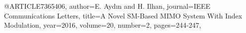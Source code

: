 @ARTICLE{7365406,
  author={E. {Aydın} and H. {Ilhan}},
  journal={IEEE Communications Letters}, 
  title={A Novel SM-Based MIMO System With Index Modulation}, 
  year={2016},
  volume={20},
  number={2},
  pages={244-247},}